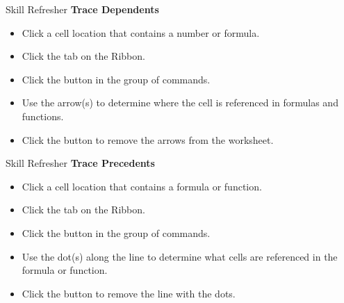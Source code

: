 \begin{center}
	\begin{sklbox}{Skill Refresher}
		\textbf{Trace Dependents}
		\\
		\begin{itemize}
			\setlength{\itemsep}{0pt}
			\setlength{\parskip}{0pt}
			\setlength{\parsep}{0pt}
			
			\item Click a cell location that contains a number or formula.
			\item Click the  tab on the Ribbon.
			\item Click the  button in the  group of commands.
			\item Use the arrow(s) to determine where the cell is referenced in formulas and functions.
			\item Click the  button to remove the arrows from the worksheet.
			
		\end{itemize}
	\end{sklbox}
\end{center}

\begin{center}
	\begin{sklbox}{Skill Refresher}
		\textbf{Trace Precedents}
		\\
		\begin{itemize}
			\setlength{\itemsep}{0pt}
			\setlength{\parskip}{0pt}
			\setlength{\parsep}{0pt}
			
			\item Click a cell location that contains a formula or function.
			\item Click the  tab on the Ribbon.
			\item Click the  button in the  group of commands.
			\item Use the dot(s) along the line to determine what cells are referenced in the formula or function.
			\item Click the  button to remove the line with the dots.
			
		\end{itemize}
	\end{sklbox}
\end{center}

